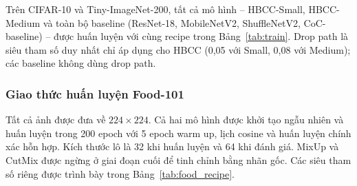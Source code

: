 \documentclass[conference]{IEEEtran}
\begin{document}
\begin{table}[h!]
  \caption{Recipe dùng chung trên CIFAR-10 và Tiny-ImageNet-200.}
  \label{tab:train}
  \centering
  \renewcommand{\arraystretch}{1.15}
\end{table}

Trên CIFAR-10 và Tiny-ImageNet-200, tất cả mô hình -- HBCC-Small,
HBCC-Medium và toàn bộ baseline (ResNet-18, MobileNetV2,
ShuffleNetV2, CoC-baseline) -- được huấn luyện với cùng recipe trong
Bảng~\ref{tab:train}. Drop path là siêu tham số duy nhất chỉ áp dụng
cho HBCC (0,05 với Small, 0,08 với Medium); các baseline không dùng
drop path.

\subsubsection{Giao thức huấn luyện Food-101}
\label{ssec:food_protocol}

Tất cả ảnh được đưa về $224\!\times\!224$. Cả hai mô hình được khởi tạo ngẫu nhiên và huấn luyện trong 200 epoch với 5 epoch warm up, lịch cosine và huấn luyện chính xác
hỗn hợp. Kích thước lô là 32 khi huấn luyện và 64 khi đánh giá. MixUp và CutMix được ngừng ở giai đoạn cuối để tinh
chỉnh bằng nhãn gốc. Các siêu tham số riêng được trình bày trong
Bảng~\ref{tab:food_recipe}.
\end{document}
